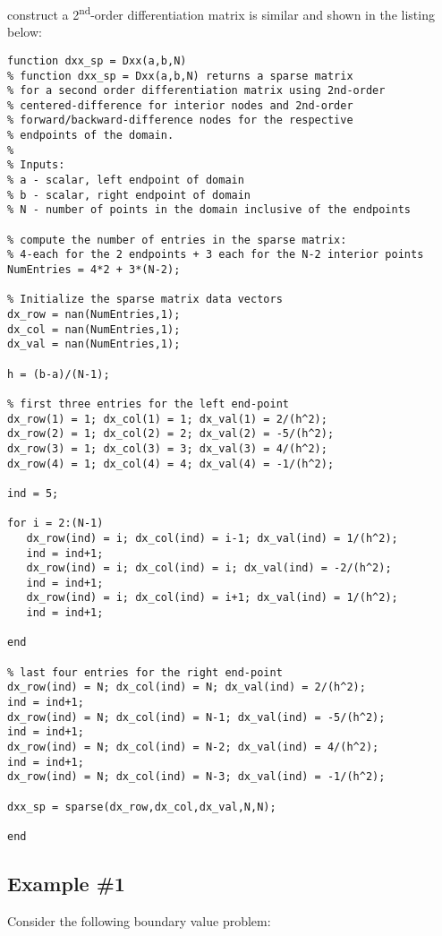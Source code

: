  construct a 2\textsuperscript{nd}-order differentiation matrix is similar and shown in the listing below:
\begin{lstlisting}[style=myMatlab,name=lec31-ypp-mat]
function dxx_sp = Dxx(a,b,N)
% function dxx_sp = Dxx(a,b,N) returns a sparse matrix
% for a second order differentiation matrix using 2nd-order
% centered-difference for interior nodes and 2nd-order
% forward/backward-difference nodes for the respective 
% endpoints of the domain.
%
% Inputs:
% a - scalar, left endpoint of domain
% b - scalar, right endpoint of domain
% N - number of points in the domain inclusive of the endpoints

% compute the number of entries in the sparse matrix:
% 4-each for the 2 endpoints + 3 each for the N-2 interior points
NumEntries = 4*2 + 3*(N-2);

% Initialize the sparse matrix data vectors
dx_row = nan(NumEntries,1);
dx_col = nan(NumEntries,1);
dx_val = nan(NumEntries,1);

h = (b-a)/(N-1);

% first three entries for the left end-point
dx_row(1) = 1; dx_col(1) = 1; dx_val(1) = 2/(h^2);
dx_row(2) = 1; dx_col(2) = 2; dx_val(2) = -5/(h^2);
dx_row(3) = 1; dx_col(3) = 3; dx_val(3) = 4/(h^2);
dx_row(4) = 1; dx_col(4) = 4; dx_val(4) = -1/(h^2);

ind = 5;

for i = 2:(N-1)
   dx_row(ind) = i; dx_col(ind) = i-1; dx_val(ind) = 1/(h^2);
   ind = ind+1;
   dx_row(ind) = i; dx_col(ind) = i; dx_val(ind) = -2/(h^2);
   ind = ind+1;
   dx_row(ind) = i; dx_col(ind) = i+1; dx_val(ind) = 1/(h^2);
   ind = ind+1;   
    
end

% last four entries for the right end-point
dx_row(ind) = N; dx_col(ind) = N; dx_val(ind) = 2/(h^2);
ind = ind+1;
dx_row(ind) = N; dx_col(ind) = N-1; dx_val(ind) = -5/(h^2);
ind = ind+1;
dx_row(ind) = N; dx_col(ind) = N-2; dx_val(ind) = 4/(h^2);
ind = ind+1;
dx_row(ind) = N; dx_col(ind) = N-3; dx_val(ind) = -1/(h^2);

dxx_sp = sparse(dx_row,dx_col,dx_val,N,N);

end
\end{lstlisting}

\subsection{Example \#1}

Consider the following boundary value problem:

